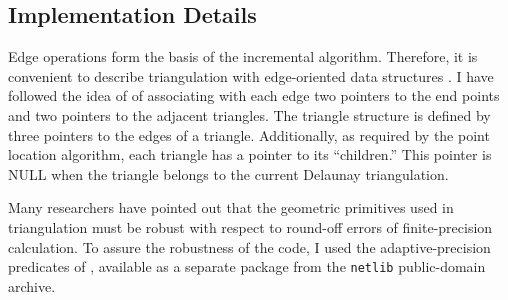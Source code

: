 

\subsection{Implementation Details}
Edge operations form the basis of the incremental algorithm.
Therefore, it is convenient to describe triangulation with
edge-oriented data structures \cite[]{stolfi}. I have followed the idea
of \cite{hansen} of associating with each edge two pointers to the
end points and two pointers to the adjacent triangles.  The triangle
structure is defined by three pointers to the edges of a triangle.
Additionally, as required by the point location algorithm, each
triangle has a pointer to its ``children.'' This pointer is NULL when
the triangle belongs to the current Delaunay triangulation.
\par
Many researchers have pointed out that the geometric
primitives used in triangulation must be robust with respect to
round-off errors of finite-precision calculation. To assure the
robustness of the code, I used the adaptive-precision predicates of
\cite{shewchuk}, available as a separate package from the
\texttt{netlib} public-domain archive.

